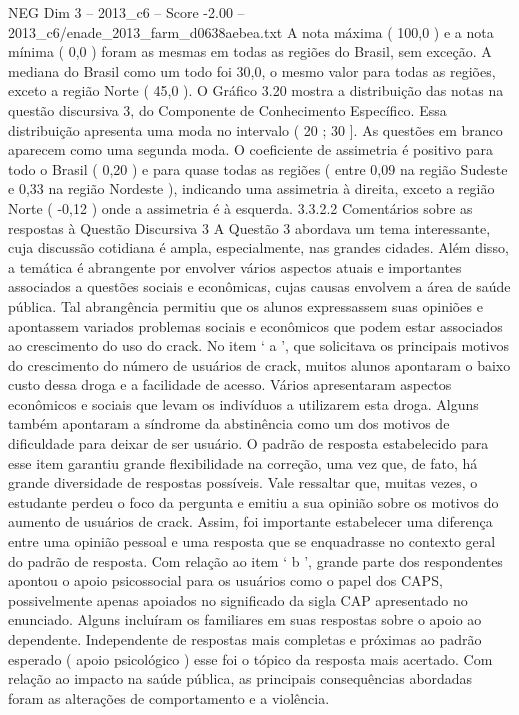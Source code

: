 \begin{textsample}{NEG Dim 3 – 2013\_c6 – Score -2.00 – 2013\_c6/enade\_2013\_farm\_d0638aebea.txt}
A nota máxima ( 100,0 ) e a nota mínima ( 0,0 ) foram as mesmas em todas as regiões do Brasil, sem exceção.
A mediana do Brasil como um todo foi 30,0, o mesmo valor para todas as regiões, exceto a região Norte ( 45,0 ).
O Gráfico 3.20 mostra a distribuição das notas na questão discursiva 3, do Componente de Conhecimento Específico.
Essa distribuição apresenta uma moda no intervalo ( 20 ; 30 ].
As questões em branco aparecem como uma segunda moda.
O coeficiente de assimetria é positivo para todo o Brasil ( 0,20 ) e para quase todas as regiões ( entre 0,09 na região Sudeste e 0,33 na região Nordeste ), indicando uma assimetria à direita, exceto a região Norte ( -0,12 ) onde a assimetria é à esquerda. 3.3.2.2 Comentários sobre as respostas à Questão Discursiva 3 A Questão 3 abordava um tema interessante, cuja discussão cotidiana é ampla, especialmente, nas grandes cidades.
Além disso, a temática é abrangente por envolver vários aspectos atuais e importantes associados a questões sociais e econômicas, cujas causas envolvem a área de saúde pública.
Tal abrangência permitiu que os alunos expressassem suas opiniões e apontassem variados problemas sociais e econômicos que podem estar associados ao crescimento do uso do crack.
No item ‘ a ’, que solicitava os principais motivos do crescimento do número de usuários de crack, muitos alunos apontaram o baixo custo dessa droga e a facilidade de acesso.
Vários apresentaram aspectos econômicos e sociais que levam os indivíduos a utilizarem esta droga.
Alguns também apontaram a síndrome da abstinência como um dos motivos de dificuldade para deixar de ser usuário.
O padrão de resposta estabelecido para esse item garantiu grande flexibilidade na correção, uma vez que, de fato, há grande diversidade de respostas possíveis.
Vale ressaltar que, muitas vezes, o estudante perdeu o foco da pergunta e emitiu a sua opinião sobre os motivos do aumento de usuários de crack.
Assim, foi importante estabelecer uma diferença entre uma opinião pessoal e uma resposta que se enquadrasse no contexto geral do padrão de resposta.
Com relação ao item ‘ b ’, grande parte dos respondentes apontou o apoio psicossocial para os usuários como o papel dos CAPS, possivelmente apenas apoiados no significado da sigla CAP apresentado no enunciado.
Alguns incluíram os familiares em suas respostas sobre o apoio ao dependente.
Independente de respostas mais completas e próximas ao padrão esperado ( apoio psicológico ) esse foi o tópico da resposta mais acertado.
Com relação ao impacto na saúde pública, as principais consequências abordadas foram as alterações de comportamento e a violência.

\end{textsample}
